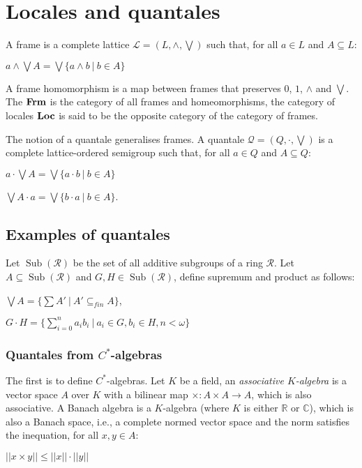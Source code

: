 \documentclass[a4paper]{article}
\theoremstyle{defin}
\theoremstyle{theorem}
\theoremstyle{claim}
\theoremstyle{prop}
\theoremstyle{lemma}
\theoremstyle{fact}
\theoremstyle{ex}
\theoremstyle{col}
\begin{document}
\section{Locales and quantales}

A frame is a complete lattice $\mathcal{L} = (L, \wedge, \bigvee)$ such that, for all $a \in L$ and $A \subseteq L$:
\begin{center}
$a \wedge \bigvee A = \bigvee \{ a \wedge b \: | \: b \in A \}$
\end{center}
A frame homomorphism is a map between frames that preserves $0$, $1$, $\wedge$ and $\bigvee$. The ${\bf Frm}$ is the category of all frames and homeomorphisms, the category of locales ${\bf Loc}$ is said to be the opposite category of the category of frames.

The notion of a quantale generalises frames. A quantale $\mathcal{Q} = (Q, \cdot, \bigvee)$ is a complete lattice-ordered semigroup such that, for all $a \in Q$ and $A \subseteq Q$:
\begin{center}
$a \cdot \bigvee A = \bigvee \{ a \cdot b \: | \: b \in A \}$

$\bigvee A \cdot a = \bigvee \{ b \cdot a \: | \: b \in A \}$.
\end{center}

\subsection{Examples of quantales}

Let $\operatorname{Sub}(\mathcal{R})$ be the set of all additive subgroups of a ring $\mathcal{R}$. Let $A \subseteq \operatorname{Sub}(\mathcal{R})$ and $G, H \in \operatorname{Sub}(\mathcal{R})$, define supremum and product as follows:
\begin{center}
$\bigvee A = \{ \sum A' \: | \: A' \subseteq_{fin} A \}$,

$G \cdot H = \{ \sum \limits_{i = 0}^n a_i b_i \: | \: a_i \in G, b_i \in H, n < \omega \}$
\end{center}

\subsubsection{Quantales from $C^{*}$-algebras}

The first is to define $C^{*}$-algebras. Let $K$ be a field, an \emph{associative $K$-algebra} is a vector space $A$ over $K$ with a bilinear map $\times : A \times A \to A$, which is also associative. A Banach algebra is a $K$-algebra (where $K$ is either $\mathbb{R}$ or $\mathbb{C}$), which is also a Banach space, i.e., a complete normed vector space and the norm satisfies the inequation, for all $x, y \in A$:
\begin{center}
$||x \times y|| \leq ||x|| \cdot ||y||$
\end{center}
\end{document}
